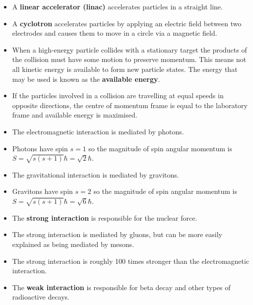 \documentclass{article}
\begin{document}
\begin{itemize}
  \item A \textbf{linear accelerator (linac)} accelerates particles in a straight line.

  \item A \textbf{cyclotron} accelerates particles by applying an electric field between two electrodes and causes them to move in a circle via a magnetic field.

  \item When a high-energy particle collides with a stationary target the products of the collision must have some motion to preserve momentum. This means not all kinetic energy is available to form new particle states. The energy that may be used is known as the \textbf{available energy}.

  \item If the particles involved in a collision are travelling at equal speeds in opposite directions, the centre of momentum frame is equal to the laboratory frame and available energy is maximised.

  \item The electromagnetic interaction is mediated by photons.

  \item Photons have spin $s = 1$ so the magnitude of spin angular momentum is $S = \sqrt{s (s + 1)} \hbar = \sqrt{2} \hbar$.

  \item The gravitational interaction is mediated by gravitons.

  \item Gravitons have spin $s = 2$ so the magnitude of spin angular momentum is $S = \sqrt{s (s + 1)} \hbar = \sqrt{6} \hbar$.

  \item The \textbf{strong interaction} is responsible for the nuclear force.

  \item The strong interaction is mediated by gluons, but can be more easily explained as being mediated by mesons.

  \item The strong interaction is roughly 100 times stronger than the electromagnetic interaction.

  \item The \textbf{weak interaction} is responsible for beta decay and other types of radioactive decays.
\end{itemize}
\end{document}
